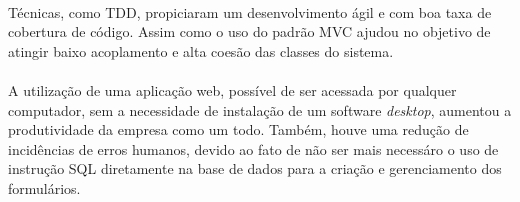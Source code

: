 \documentclass[11pt]{article}
\begin{document}
    \paragraph{}
    Técnicas, como TDD, propiciaram um desenvolvimento ágil e com boa taxa 
    de cobertura de código. Assim como o uso do padrão MVC ajudou no objetivo de atingir baixo acoplamento
    e alta coesão das classes do sistema.
    
    \paragraph{}
    A utilização de uma aplicação web, possível de ser acessada por
    qualquer computador, sem a necessidade de instalação de um software 
    {\em desktop}, aumentou a produtividade da empresa como um todo. Também,
    houve uma redução de incidências de erros humanos, devido ao fato de não ser mais necessáro o
    uso de instrução SQL diretamente na base de dados para a criação e gerenciamento dos formulários.

  \newpage
  {}
  
  
\end{document}
